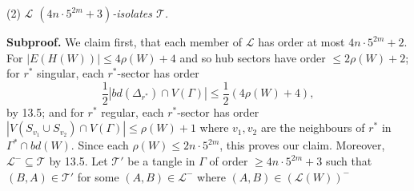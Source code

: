 \hspace*{12pt}(2) \textit{$\mathscr{L}$ $(4n \cdot 5^{2m} + 3)$-isolates $\mathscr{T}$.}

\textbf{Subproof.} We claim first, that each member of $\mathscr{L}$ has order at most $4n \cdot 5^{2m} + 2$. For $|E(H(W))| \le 4\rho(W) + 4$ and so hub sectors have order $\le 2\rho(W) + 2$; for $r^*$ singular, each $r^*$-sector has order
\begin{equation*}
\frac{1}{2}|bd(\Delta_{r^*}) \cap V(\Gamma)| \le \frac{1}{2}(4\rho(W) + 4),
\end{equation*}
by 13.5; and for $r^*$ regular, each $r^*$-sector has order $|V(S_{v_1} \cup S_{v_2}) \cap V(\Gamma)| \le \rho(W) + 1$ where $v_1, v_2$ are the neighbours of $r^*$ in $\Gamma^* \cap bd(W)$. Since each $\rho(W) \le 2n \cdot 5^{2m}$, this proves our claim. Moreover, $\mathscr{L}^- \subseteq \mathscr{T}$ by 13.5. Let $\mathscr{T}'$ be a tangle in $\Gamma$ of order $\ge 4n \cdot 5^{2m} + 3$ such that $(B, A) \in \mathscr{T}'$ for some $(A, B) \in \mathscr{L}^-$ where $(A, B) \in (\mathscr{L}(W))^-$
